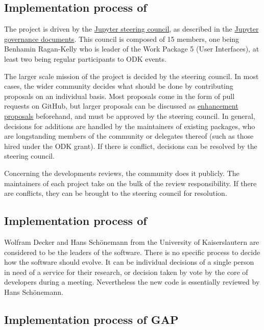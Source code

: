 \documentclass{deliverablereport}
\begin{document}
\subsection{Implementation process of \Jupyter}

The \Jupyter project is driven by the \href{https://jupyter.org/about.html}{Jupyter steering council}, as described in the \href{https://github.com/jupyter/governance}{Jupyter governance documents}. This council is composed of 15 members, one being Benhamin Ragan-Kelly who is leader of the Work Package 5 (User Interfaces),  at least two being regular participants to ODK events. 

The larger scale mission of the project is decided by the steering council. In most cases, the wider \Jupyter community decides what should be done by contributing proposals on an individual basis. Most proposals come in the form of pull requests on GitHub, but larger proposals can be discussed as \href{https://github.com/jupyter/enhancement-proposals}{enhancement proposals} beforehand, and must be approved by the steering council. In general, decisions for additions are handled by the maintainers of existing packages, who are longstanding members of the community or delegates thereof (such as those hired under the ODK grant). If there is conflict, decisions can be resolved by the steering council.

Concerning the developments reviews, the \Jupyter community does it publicly. The maintainers of each project take on the bulk of the review responsibility. If there are conflicts, they can be brought to the steering council for resolution.


\subsection{Implementation process of \Singular}

Wolfram Decker and Hans Schönemann from the University of Kaiserslautern are considered to be the leaders of the \Singular software. 
There is no specific process to decide how the software should evolve. It can be individual decisions of a single person in need of a service for their research, or decision taken by vote by the core of \Singular developers during a meeting.
Nevertheless the new code is essentially reviewed by Hans Schönemann.

\subsection{Implementation process of GAP}
\end{document}
